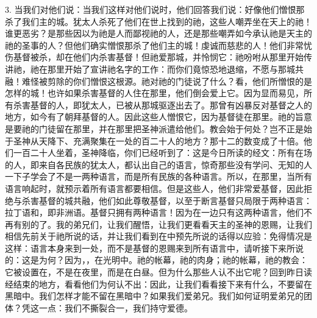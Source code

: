3. 当我们对他们说：当我们这样对他们说时，他们回答我们说：好像他们憎恨那杀了我们主的城。犹太人杀死了他们在世上找到的祂，这些人嘲弄坐在天上的祂！谁更恶劣？是那些因以为祂是人而鄙视祂的人，还是那些嘲弄如今承认祂是天主的祂的圣事的人？但他们确实憎恨那杀了他们主的城！虔诚而慈悲的人！他们非常忧伤基督被杀，却在他们内杀害基督！但祂爱那城，并怜悯它：祂吩咐从那里开始传讲祂，祂在那里开始了宣讲祂名字的工作：而你们竟惊恐地退缩，不愿与那城共融！难怪被剪除的你们憎恨这根源。祂对祂的门徒说了什么？看，他们所憎恨的是怎样的城！也许如果杀害基督的人住在那里，他们倒会爱上它。因为显而易见，所有杀害基督的人，即犹太人，已被从那城驱逐出去了。那曾有凶暴反对基督之人的地方，如今有了朝拜基督的人。因此这些人憎恨它，因为基督徒在那里。祂的旨意是要祂的门徒留在那里，并在那里把圣神派遣给他们。教会始于何处？岂不正是始于圣神从天降下、充满聚集在一处的百二十人的地方？那十二的数变成了十倍。他们一百二十人坐着，圣神降临，你们已经听到了：这是今日所读的经文：所有在场的人，即来自各民族的犹太人，都认出自己的语言，惊奇那些没有学问、无知的人一下子学会了不是一两种语言，而是所有民族的各种语言。所以，在那里，当所有语言响起时，就预示着所有语言都要相信。但是这些人，他们非常爱基督，因此拒绝与杀害基督的城共融，他们如此尊敬基督，以至于断言基督只局限于两种语言：拉丁语和，即非洲语。基督只拥有两种语言！因为在一边只有这两种语言，他们不再有别的了。我的弟兄们，让我们醒悟，让我们更看看天主的圣神的恩赐，让我们相信先前关于祂所说的话，并让我们看到在中预先所说的话得以应验：免得情况是这样：语言本身来到一处，而不是基督的恩赐来到所有语言中，请听接下来所说的：这是为何？因为，，在光明中。祂的帐幕，祂的肉身；祂的帐幕，祂的教会：它被设置在，不是在夜里，而是在白昼。但为什么那些人认不出它呢？回到昨日读经结束的地方，看看他们为何认不出：因此，让我们看看接下来有什么，不要留在黑暗中。我们怎样才能不留在黑暗中？如果我们爱弟兄。我们如何证明爱弟兄的团体？凭这一点：我们不撕裂合一，我们持守爱德。\par


